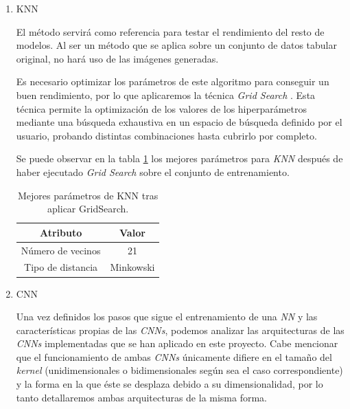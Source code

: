         \begin{enumerate}

            \item KNN

                El método  servirá como referencia para testar el rendimiento del resto de modelos. Al ser un método que se aplica sobre un conjunto de datos tabular original, no hará uso de las imágenes generadas.

                Es necesario optimizar los parámetros de este algoritmo para conseguir un buen rendimiento, por lo que aplicaremos la técnica \textit{Grid Search} \cite{GridSearchSklearnLibrary}. Esta técnica permite la optimización de los valores de los hiperparámetros mediante una búsqueda exhaustiva en un espacio de búsqueda definido por el usuario, probando distintas combinaciones hasta cubrirlo por completo. 


                Se puede observar en la tabla \ref{BestParamsKNNGridSearchTable} los mejores parámetros para \textit{KNN} después de haber ejecutado \textit{Grid Search} sobre el conjunto de entrenamiento.\\

                \begin{table}[H]
                    \centering
                    \begin{tabular}{ |c|c| }
                        \hline
                        Atributo & Valor\\
                        \hline
                            Número de vecinos & 21 \\ 
                            Tipo de distancia & Minkowski \\ 
                        \hline
                    \end{tabular}
                    \caption{Mejores parámetros de KNN tras aplicar GridSearch.}
                    \label{BestParamsKNNGridSearchTable}
                \end{table}


            \item CNN

                Una vez definidos los pasos que sigue el entrenamiento de una \textit{NN} y las características propias de las \textit{CNNs}, podemos analizar las arquitecturas de las \textit{CNNs} implementadas que se han aplicado en este proyecto. Cabe mencionar que el funcionamiento de ambas \textit{CNNs} únicamente difiere en el tamaño del \textit{kernel} (unidimensionales o bidimensionales según sea el caso correspondiente) y la forma en la que éste se desplaza debido a su dimensionalidad, por lo tanto detallaremos ambas arquitecturas de la misma forma.


\end{enumerate}
